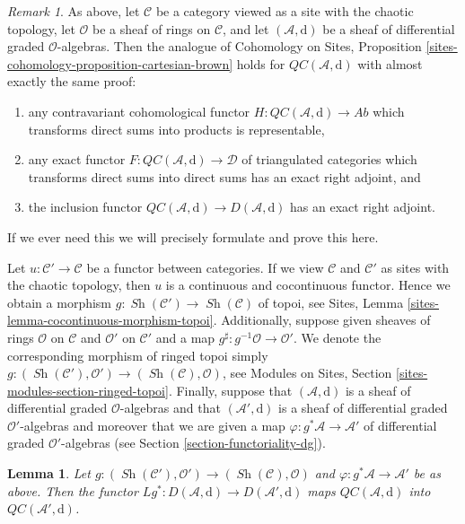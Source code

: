 \documentclass{stacks-project}
\theoremstyle{plain}
\newtheorem{lemma}[subsection]{Lemma}
\theoremstyle{definition}
\theoremstyle{remark}
\newtheorem{remark}[subsection]{Remark}
\numberwithin{equation}{subsection}
\def\Sh{\mathop{\mathit{Sh}}\nolimits}
\begin{document}
\begin{remark}
\label{remark-cartesian-brown}
As above, let $\mathcal{C}$ be a category viewed as a site with
the chaotic topology, let $\mathcal{O}$ be a sheaf of rings on $\mathcal{C}$,
and let $(\mathcal{A}, \text{d})$ be a sheaf of differential graded
$\mathcal{O}$-algebras. Then the analogue of
Cohomology on Sites, Proposition
\ref{sites-cohomology-proposition-cartesian-brown}
holds for $\mathit{QC}(\mathcal{A}, \text{d})$ with almost
exactly the same proof:
\begin{enumerate}
\item any contravariant cohomological functor
$H : \mathit{QC}(\mathcal{A}, \text{d}) \to \textit{Ab}$
which transforms direct sums into products is representable,
\item any exact functor
$F : \mathit{QC}(\mathcal{A}, \text{d}) \to \mathcal{D}$
of triangulated categories which transforms direct sums into direct sums
has an exact right adjoint, and
\item the inclusion functor
$\mathit{QC}(\mathcal{A}, \text{d}) \to D(\mathcal{A}, \text{d})$ has
an exact right adjoint.
\end{enumerate}
If we ever need this we will precisely formulate and prove this here.
\end{remark}

\noindent
Let $u : \mathcal{C}' \to \mathcal{C}$ be a functor between categories.
If we view $\mathcal{C}$ and $\mathcal{C}'$ as sites with the chaotic
topology, then $u$ is a continuous and cocontinuous functor. Hence
we obtain a morphism $g : \Sh(\mathcal{C}') \to \Sh(\mathcal{C})$
of topoi, see Sites, Lemma \ref{sites-lemma-cocontinuous-morphism-topoi}.
Additionally, suppose given sheaves of rings $\mathcal{O}$ on $\mathcal{C}$
and $\mathcal{O}'$ on $\mathcal{C}'$ and a map
$g^\sharp : g^{-1}\mathcal{O} \to \mathcal{O}'$.
We denote the corresponding morphism of ringed topoi simply
$g : (\Sh(\mathcal{C}'), \mathcal{O}') \to (\Sh(\mathcal{C}), \mathcal{O})$,
see Modules on Sites, Section \ref{sites-modules-section-ringed-topoi}.
Finally, suppose that $(\mathcal{A}, \text{d})$ is a sheaf of differential
graded $\mathcal{O}$-algebras and that 
$(\mathcal{A}', \text{d})$ is a sheaf of differential
graded $\mathcal{O}'$-algebras and moreover that we are given a map
$\varphi : g^*\mathcal{A} \to \mathcal{A}'$ of differential graded
$\mathcal{O}'$-algebras (see Section \ref{section-functoriality-dg}).

\begin{lemma}
\label{lemma-cartesian-functorial}
Let $g : (\Sh(\mathcal{C}'), \mathcal{O}') \to (\Sh(\mathcal{C}), \mathcal{O})$
and $\varphi : g^*\mathcal{A} \to \mathcal{A}'$
be as above. Then the functor
$Lg^* : D(\mathcal{A}, \text{d}) \to D(\mathcal{A}', \text{d})$
maps $\mathit{QC}(\mathcal{A}, \text{d})$ into
$\mathit{QC}(\mathcal{A}', \text{d})$.
\end{lemma}
\end{document}
